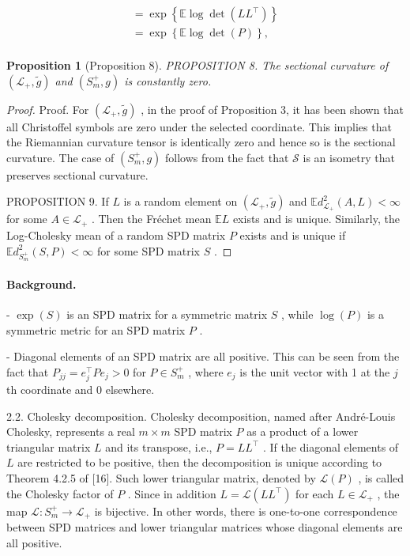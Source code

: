 \documentclass[11pt]{article}
\newtheorem{proposition}{Proposition}
\begin{document}
$$
\begin{array}{l} = \exp \left\{\mathbb {E} \log \det  (L L ^ {\top}) \right\} \\ = \exp \left\{\mathbb {E} \log \det  (P) \right\}, \\ \end{array}
$$


\begin{proposition}[Proposition 8]
PROPOSITION 8. The sectional curvature of  $(\mathcal{L}_{+},\tilde{g})$  and  $(S_m^+,g)$  is constantly zero.
\end{proposition}

\begin{proof}
Proof. For  $(\mathcal{L}_{+},\tilde{g})$ , in the proof of Proposition 3, it has been shown that all Christoffel symbols are zero under the selected coordinate. This implies that the Riemannian curvature tensor is identically zero and hence so is the sectional curvature. The case of  $(S_m^+,g)$  follows from the fact that  $\mathcal{S}$  is an isometry that preserves sectional curvature.

PROPOSITION 9. If  $L$  is a random element on  $(\mathcal{L}_{+},\tilde{g})$  and  $\mathbb{E}d_{\mathcal{L}_+}^2 (A,L) < \infty$  for some  $A\in \mathcal{L}_{+}$ . Then the Fréchet mean  $\mathbb{E}L$  exists and is unique. Similarly, the Log-Cholesky mean of a random SPD matrix  $P$  exists and is unique if  $\mathbb{E}d_{S_m^+}^2 (S,P) < \infty$  for some SPD matrix  $S$ .

\end{proof}

\paragraph{Background.}
-  $\exp(S)$  is an SPD matrix for a symmetric matrix  $S$ , while  $\log(P)$  is a symmetric metric for an SPD matrix  $P$ .

- Diagonal elements of an SPD matrix are all positive. This can be seen from the fact that  $P_{jj} = e_j^\top Pe_j > 0$  for  $P \in S_m^+$ , where  $e_j$  is the unit vector with 1 at the  $j$ th coordinate and 0 elsewhere.

2.2. Cholesky decomposition. Cholesky decomposition, named after André-Louis Cholesky, represents a real  $m \times m$  SPD matrix  $P$  as a product of a lower triangular matrix  $L$  and its transpose, i.e.,  $P = LL^{\top}$ . If the diagonal elements of  $L$  are restricted to be positive, then the decomposition is unique according to Theorem 4.2.5 of [16]. Such lower triangular matrix, denoted by  $\mathcal{L}(P)$ , is called the Cholesky factor of  $P$ . Since in addition  $L = \mathcal{L}(LL^{\top})$  for each  $L \in \mathcal{L}_{+}$ , the map  $\mathcal{L}: S_{m}^{+} \to \mathcal{L}_{+}$  is bijective. In other words, there is one-to-one correspondence between SPD matrices and lower triangular matrices whose diagonal elements are all positive.
\end{document}
